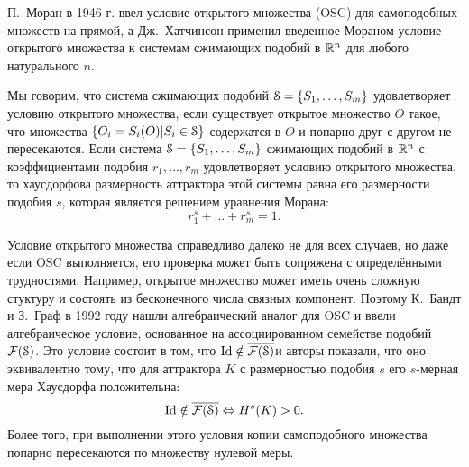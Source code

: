 
П.~Моран в 1946 г. \cite{Moran1946} ввел условие открытого множества (OSC) для самоподобных множеств на прямой, а Дж.~Хатчинсон \cite{Hut1981} применил введенное Мораном условие открытого множества к системам сжимающих подобий в $\mathbb{R}^n$ для любого натурального $n$.

Мы говорим, что система сжимающих подобий ${\EuScript S}=\{S_1, \ldots, S_m\}$ удовлетворяет условию открытого множества, если существует открытое множество $O$ такое, что множества $\{O_i=S_i(O) | S_i\in{\EuScript S}\}$ содержатся в $O$ и попарно друг с другом не пересекаются.
Если система ${\EuScript S}=\{S_1,\ldots,S_m\}$ сжимающих подобий в $\mathbb{R}^n$ с коэффициентами подобия $r_1, \ldots, r_m$ удовлетворяет условию открытого множества, то хаусдорфова размерность аттрактора этой системы равна его размерности подобия $s$, которая является решением уравнения Морана: $$r_1^s+\ldots+r_m^s=1.$$ 

Условие открытого множества справедливо далеко не для всех случаев, но даже если OSC выполняется, его проверка может быть сопряжена с определёнными трудностями.
Например, открытое множество может иметь очень сложную стуктуру и состоять из бесконечного числа связных компонент.
Поэтому К.~Бандт и З.~Граф в 1992 году \cite{SSS7} нашли алгебраический аналог для OSC и ввели алгебраическое условие, основанное на ассоциированном семействе подобий $\mathcal{F}({\EuScript S})$. 
Это условие состоит в том, что $\mathop{\rm Id} \nolimits\notin\overline{\mathcal{F}({\EuScript S})}$и авторы показали, что оно эквивалентно тому, что для аттрактора $K$ с размерностью подобия $s$ его $s$-мерная мера Хаусдорфа положительна:
$$\mathop{\rm Id} \nolimits\notin\overline{\mathcal{F}({\EuScript S})} \Leftrightarrow H^s(K)>0.$$
Более того, при выполнении этого условия копии самоподобного множества попарно пересекаются по множеству нулевой меры.

